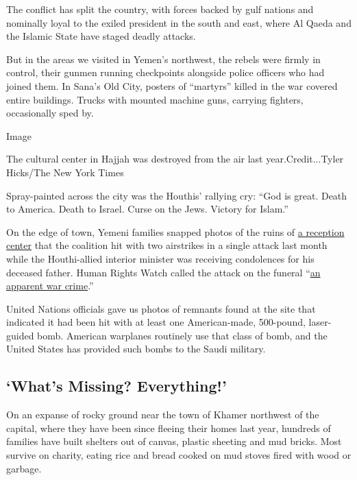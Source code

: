 The conflict has split the country, with forces backed by gulf nations
and nominally loyal to the exiled president in the south and east, where
Al Qaeda and the Islamic State have staged deadly attacks.

But in the areas we visited in Yemen's northwest, the rebels were firmly
in control, their gunmen running checkpoints alongside police officers
who had joined them. In Sana's Old City, posters of ``martyrs'' killed
in the war covered entire buildings. Trucks with mounted machine guns,
carrying fighters, occasionally sped by.

Image

The cultural center in Hajjah was destroyed from the air last
year.Credit...Tyler Hicks/The New York Times

Spray-painted across the city was the Houthis' rallying cry: ``God is
great. Death to America. Death to Israel. Curse on the Jews. Victory for
Islam.''

On the edge of town, Yemeni families snapped photos of the ruins of
\href{http://www.nytimes3xbfgragh.onion/video/world/middleeast/100000004736495/in-the-rubble-of-an-airstrike-in-yemen.html}{a
reception center} that the coalition hit with two airstrikes in a single
attack last month while the Houthi-allied interior minister was
receiving condolences for his deceased father. Human Rights Watch called
the attack on the funeral
``\href{https://www.hrw.org/news/2016/10/13/yemen-saudi-led-funeral-attack-apparent-war-crime}{an
apparent war crime}.''

United Nations officials gave us photos of remnants found at the site
that indicated it had been hit with at least one American-made,
500-pound, laser-guided bomb. American warplanes routinely use that
class of bomb, and the United States has provided such bombs to the
Saudi military.

\hypertarget{whats-missing-everything}{%
\subsection{`What's Missing?
Everything!'}\label{whats-missing-everything}}

On an expanse of rocky ground near the town of Khamer northwest of the
capital, where they have been since fleeing their homes last year,
hundreds of families have built shelters out of canvas, plastic sheeting
and mud bricks. Most survive on charity, eating rice and bread cooked on
mud stoves fired with wood or garbage.

